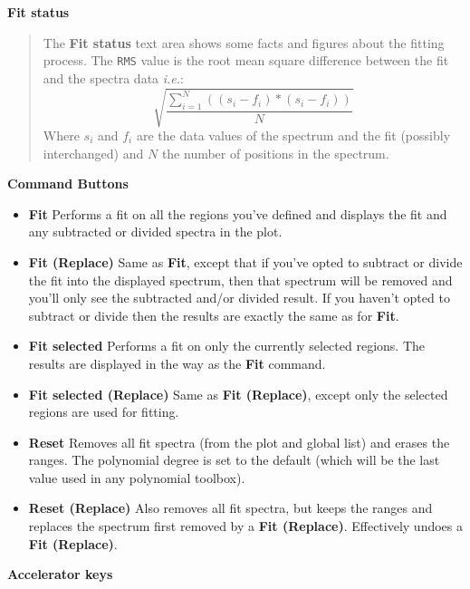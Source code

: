 \documentclass[twoside,11pt,nolof]{starlink}
\newcommand{\labelitem}[1]{\textbf{#1}}
\providecommand{\hitext}[1]{\texttt{#1}}
\providecommand{\ie}{\textit{i.e.}}
\providecommand{\subheading}[1]{\textbf{\large{#1}}}
\begin{document}
\subheading{Fit status}
\begin{quote}
 The \labelitem{Fit status} text area shows some facts and figures about
 the fitting process. The \hitext{RMS} value is the root mean square
 difference between the fit and the spectra data \ie:
 \[
 \displaystyle\sqrt{
    \displaystyle\frac{
       \displaystyle\sum_{i=1}^{N}((s_{i}-f_{i})*(s_{i}-f_{i}))}{N}}
 \]
 Where $s_{i}$ and $f_{i}$ are the data values of the spectrum and the
 fit (possibly interchanged) and $N$ the number of positions in the
 spectrum.
\end{quote}

\subheading{Command Buttons}

\begin{itemize}

\item \labelitem{Fit} Performs a fit on all the regions you've defined and displays
the fit and any subtracted or divided spectra in the plot.

\item \labelitem{Fit (Replace)} Same as \labelitem{Fit}, except that if you've
opted to subtract or divide the fit into the displayed spectrum, then that
spectrum will be removed and you'll only see the subtracted and/or divided
result. If you haven't opted to subtract or divide then the results are
exactly the same as for \labelitem{Fit}.

\item \labelitem{Fit selected} Performs a fit on only the currently selected
regions. The results are displayed in the way as the \labelitem{Fit} command.

\item \labelitem{Fit selected (Replace)} Same as \labelitem{Fit (Replace)},
except only the selected regions are used for fitting.

\item \labelitem{Reset} Removes all fit spectra (from the plot and global list)
and erases the ranges. The polynomial degree is set to the default (which will
be the last value used in any polynomial toolbox).

\item \labelitem{Reset (Replace)} Also removes all fit spectra, but keeps the
ranges and replaces the spectrum first removed by a \labelitem{Fit (Replace)}.
Effectively undoes a \labelitem{Fit (Replace)}.

\end{itemize}

\subheading{Accelerator keys}
\end{document}
